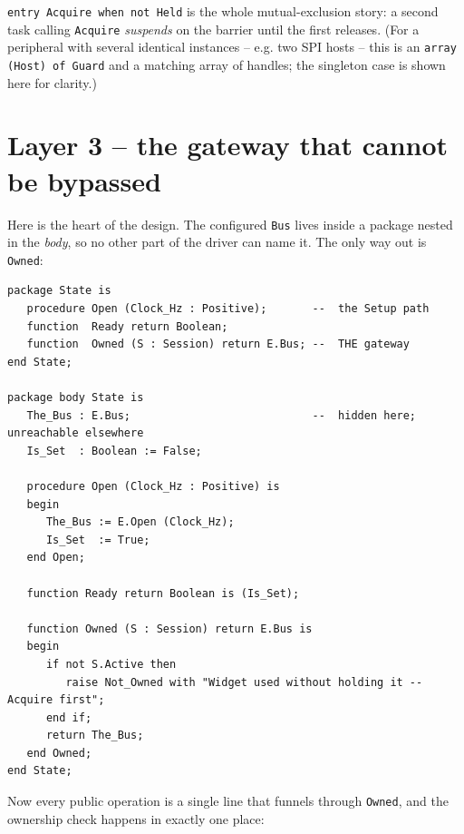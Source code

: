 \texttt{entry Acquire when not Held} is the whole mutual-exclusion story: a second
task calling \texttt{Acquire} \emph{suspends} on the barrier until the first
releases. (For a peripheral with several identical instances -- e.g. two SPI
hosts -- this is an \texttt{array (Host) of Guard} and a matching array of
handles; the singleton case is shown here for clarity.)

\section{Layer 3 -- the gateway that cannot be bypassed}

Here is the heart of the design. The configured \texttt{Bus} lives inside a
package nested in the \emph{body}, so no other part of the driver can name it. The
only way out is \texttt{Owned}:

\begin{lstlisting}
package State is
   procedure Open (Clock_Hz : Positive);       --  the Setup path
   function  Ready return Boolean;
   function  Owned (S : Session) return E.Bus; --  THE gateway
end State;

package body State is
   The_Bus : E.Bus;                            --  hidden here; unreachable elsewhere
   Is_Set  : Boolean := False;

   procedure Open (Clock_Hz : Positive) is
   begin
      The_Bus := E.Open (Clock_Hz);
      Is_Set  := True;
   end Open;

   function Ready return Boolean is (Is_Set);

   function Owned (S : Session) return E.Bus is
   begin
      if not S.Active then
         raise Not_Owned with "Widget used without holding it -- Acquire first";
      end if;
      return The_Bus;
   end Owned;
end State;
\end{lstlisting}

Now every public operation is a single line that funnels through \texttt{Owned},
and the ownership check happens in exactly one place:

